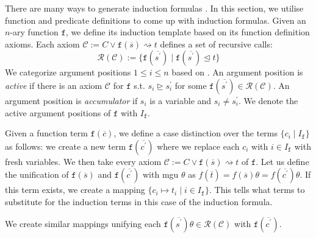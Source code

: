 
There are many ways to generate induction formulas \cite{aclhandbook,bundychapter,cruanes,hipspec,hipster,isaplanner,computing}. In this section, we utilise function and predicate definitions to come up with induction formulas. Given an $n$-ary function $\mathtt{f}$, we define its induction template based on its function definition axioms. Each axiom $\mathcal{C}:=C\lor \mathtt{f}(\overline{s}) \rightsquigarrow t$ defines a set of recursive calls:
$$\mathcal{R}(\mathcal{C}):=\{\mathtt{f}(\overline{s^\prime})\mid \mathtt{f}(\overline{s^\prime})\trianglelefteq t\}$$
We categorize argument positions $1\le i\le n$ based on \cite{cruanes}. An argument position is \textit{active} if there is an axiom $\mathcal{C}$ for $\mathtt{f}$ s.t. $s_i \trianglerighteq s^\prime_i$ for some $\mathtt{f}(\overline{s^\prime})\in\mathcal{R}(\mathcal{C})$. An argument position is \textit{accumulator} if $s_i$ is a variable and $s_i\neq s^\prime_i$. We denote the active argument positions of $\mathtt{f}$ with $I_\mathtt{f}$.


Given a function term $\mathtt{f}(\overline{c})$, we define a case distinction over the terms $\{c_i\mid I_\mathtt{f}\}$ as follows: we create a new term $\mathtt{f}(\overline{c^\prime})$ where we replace each $c_i$ with $i\in I_\mathtt{f}$ with fresh variables. We then take every axiom $\mathcal{C}:=C\lor \mathtt{f}(\overline{s}) \rightsquigarrow t$ of $\mathtt{f}$. Let us define the unification of $\mathtt{f}(\overline{s})$ and $\mathtt{f}(\overline{c^\prime})$ with mgu $\theta$ as $f(\overline{t})=f(\overline{s})\theta=f(\overline{c^\prime})\theta$. If this term exists, we create a mapping $\{c_i\mapsto t_i\mid i\in I_\mathtt{f}\}$. This tells what terms to substitute for the induction terms in this case of the induction formula.

We create similar mappings unifying each $\mathtt{f}(\overline{s^\prime})\theta\in\mathcal{R}(\mathcal{C})$ with $\mathtt{f}(\overline{c^\prime})$.


